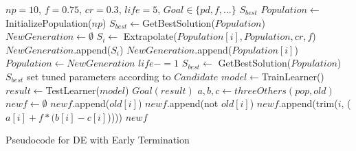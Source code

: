 \begin{algorithm}[!htp]

\scriptsize
\begin{algorithmic}[1]
\Require $\mathit{np} = 10$, $f=0.75$, $cr=0.3$, $\mathit{life} = 5$, $\mathit{Goal} \in \{\mathit{pd},f,...\}$
\Ensure $\mathit{S_{best}}$
\vspace{2mm}
 \State $\mathit{Population}  \gets $ InitializePopulation($\mathit{np}$)   
 \State $\mathit{S_{best}} \gets $GetBestSolution($\mathit{Population}$)
    \State $NewGeneration \gets \emptyset$
        \State $\mathit{S_i} \gets$ Extrapolate($\mathit{Population [i], Population , cr, f}$)
            \State $\mathit{NewGeneration}$.append($\mathit{S_i}$)
        \Else
        \State $\mathit{NewGeneration}$.append($\mathit{Population [i]}$)
        \EndIf
    \EndFor
    \State $\mathit{Population  \gets NewGeneration}$
        \State $\mathit{life -=1}$
    \EndIf
    \State $\mathit{S_{best} }\gets$ GetBestSolution($\mathit{Population} $)
 \EndWhile
\State \Return $\mathit{S_{best}}$
\EndFunction
{}
  \State set tuned parameters according to $\mathit{Candidate}$
  \State $\mathit{model} \gets$TrainLearner()
  \State $\mathit{result} \gets$TestLearner($\mathit{model}$)   
  \State \Return$\mathit{Goal}(\mathit{result})$  
\EndFunction
{}
  \State $\mathit{a, b, c}\gets threeOthers(\mathit{pop,old})$  
  \State $\mathit{newf }\gets \emptyset$
            \State $\mathit{newf}$.append($\mathit{old[i]}$)
        \Else
                \State $\mathit{newf}$.append(not $\mathit{old[i]}$)
            \Else
                \State $\mathit{newf}$.append(trim($i$, ($\mathit{a[i]+f*(b[i]-c[i]}$)))) 
         \EndIf
      \EndIf
  \EndFor
 \State \Return $\mathit{newf}$
\EndFunction
\end{algorithmic} 
\caption{Pseudocode for DE with Early Termination}
\label{alg:DE}
\end{algorithm}




